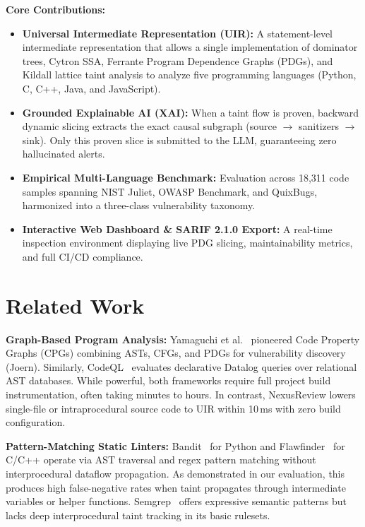 \documentclass[10pt,conference]{IEEEtran}
\begin{document}
\textbf{Core Contributions:}
\begin{itemize}
    \item \textbf{Universal Intermediate Representation (UIR):} A statement-level intermediate representation that allows a single implementation of dominator trees, Cytron SSA, Ferrante Program Dependence Graphs (PDGs), and Kildall lattice taint analysis to analyze five programming languages (Python, C, C++, Java, and JavaScript).
    \item \textbf{Grounded Explainable AI (XAI):} When a taint flow is proven, backward dynamic slicing extracts the exact causal subgraph (source $\to$ sanitizers $\to$ sink). Only this proven slice is submitted to the LLM, guaranteeing zero hallucinated alerts.
    \item \textbf{Empirical Multi-Language Benchmark:} Evaluation across 18{,}311 code samples spanning NIST Juliet, OWASP Benchmark, and QuixBugs, harmonized into a three-class vulnerability taxonomy.
    \item \textbf{Interactive Web Dashboard \& SARIF 2.1.0 Export:} A real-time inspection environment displaying live PDG slicing, maintainability metrics, and full CI/CD compliance.
\end{itemize}

\section{Related Work}

\textbf{Graph-Based Program Analysis:} Yamaguchi et al.~\cite{joern2014} pioneered Code Property Graphs (CPGs) combining ASTs, CFGs, and PDGs for vulnerability discovery (Joern). Similarly, CodeQL~\cite{codeql2020} evaluates declarative Datalog queries over relational AST databases. While powerful, both frameworks require full project build instrumentation, often taking minutes to hours. In contrast, NexusReview lowers single-file or intraprocedural source code to UIR within 10\,ms with zero build configuration.

\textbf{Pattern-Matching Static Linters:} Bandit~\cite{bandit} for Python and Flawfinder~\cite{flawfinder} for C/C++ operate via AST traversal and regex pattern matching without interprocedural dataflow propagation. As demonstrated in our evaluation, this produces high false-negative rates when taint propagates through intermediate variables or helper functions. Semgrep~\cite{semgrep} offers expressive semantic patterns but lacks deep interprocedural taint tracking in its basic rulesets.
\end{document}
